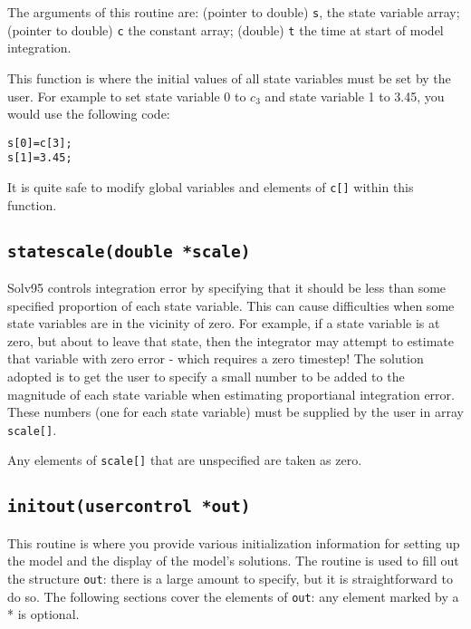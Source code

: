 \documentclass[10pt] {article}
\begin{document}
The arguments of this routine are: (pointer to double) \verb+s+, the state variable array; %
(pointer to double) \verb+c+ the constant array; (double) \verb+t+ the time at start of model %
integration.

This function is where the initial values of all state variables must be set by the user. For %
example to set state variable 0 to $ c_3$ and state variable 1 to 3.45, you would use the %
following code:
\begin{verbatim}
s[0]=c[3];
s[1]=3.45;
\end{verbatim}
It is quite safe to modify global variables and elements of \verb+c[]+ within this function.

\subsection{\tt statescale(double *scale)}

Solv95 controls integration error by specifying that it should be less than some specified %
proportion of each state variable. This can cause difficulties when some state variables are in %
the vicinity of zero. For example, if a state variable is at zero, but about to leave that state, %
then the integrator may attempt to estimate that variable with zero error - which requires a zero %
timestep! The solution adopted is to get the user to specify a small number to be added to the %
magnitude of each state variable when estimating proportianal integration error. These numbers %
(one for each state variable) must be supplied by the user in array \verb+scale[]+. 

Any elements of \verb+scale[]+ that are unspecified are taken as zero.  

\subsection{\tt initout(usercontrol *out)}
 
This routine is where you provide various initialization information for setting up the model and %
the display of the model's solutions. The routine is used to fill out the structure \verb+out+: %
there is a large amount to specify, but it is straightforward to do so. The following sections %
cover the  elements of \verb+out+: any element marked by a * is optional.
\end{document}
